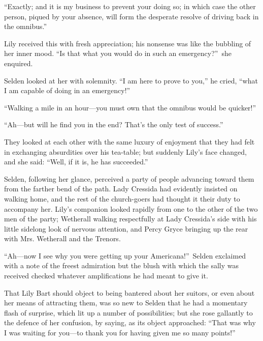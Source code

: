 \documentclass[12pt,a4paper]{book}
\begin{document}
``Exactly; and it is my business to prevent your doing so; in
which case the other person, piqued by your absence, will form
the desperate resolve of driving back in the omnibus.''





Lily received this with fresh appreciation; his nonsense was like
the bubbling of her inner mood. ``Is that what you would do in
such an emergency?''\ she enquired.





Selden looked at her with solemnity. ``I am here to prove to you,''
he cried, ``what I am capable of doing in an emergency!''





``Walking a mile in an hour---you must own that the omnibus would
be quicker!''





``Ah---but will he find you in the end? That's the only test of
success.''





They looked at each other with the same luxury of enjoyment that
they had felt in exchanging absurdities over his tea-table; but
suddenly Lily's face changed, and she said: ``Well, if it is, he
has succeeded.''





Selden, following her glance, perceived a party of people
advancing toward them from the farther bend of the path. Lady
Cressida had evidently insisted on walking home, and the rest of
the church-goers had thought it their duty to accompany
her. Lily's companion looked rapidly from one to the other of the
two men of the party; Wetherall walking respectfully at Lady
Cressida's side with his little sidelong look of nervous
attention, and Percy Gryce bringing up the rear with Mrs.
Wetherall and the Trenors.





``Ah---now I see why you were getting up your Americana!''\ Selden
exclaimed with a note of the freest admiration but the blush with
which the sally was received checked whatever amplifications he
had meant to give it.





That Lily Bart should object to being bantered about her suitors,
or even about her means of attracting them, was so new to Selden
that he had a momentary flash of surprise, which lit up a number
of possibilities; but she rose gallantly to the defence of her
confusion, by saying, as its object approached: ``That was why I
was waiting for you---to thank you for having given me so many
points!''
\end{document}
